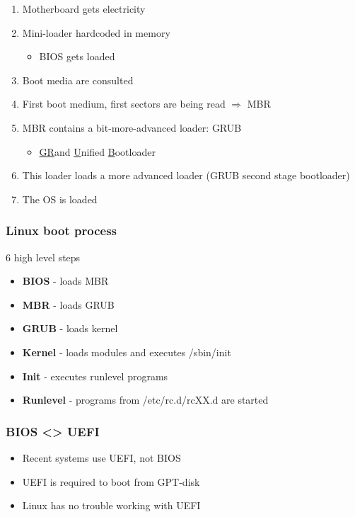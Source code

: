 \documentclass{article}
\begin{document}
\begin{enumerate}
    \item Motherboard gets electricity
    \item Mini-loader hardcoded in memory
    \begin{itemize}
        \item BIOS gets loaded
    \end{itemize}
    \item Boot media are consulted
    \item First boot medium, first sectors are being read $\Rightarrow$ MBR
    \item MBR contains a bit-more-advanced loader: GRUB
    \begin{itemize}
        \item \underline{GR}and \underline{U}nified \underline{B}ootloader
    \end{itemize}
    \item This loader loads a more advanced loader (GRUB second stage bootloader)
    \item The OS is loaded
\end{enumerate}

\subsubsection{Linux boot process}

6 high level steps

\begin{itemize}
    \item \textbf{BIOS} - loads MBR
    \item \textbf{MBR} - loads GRUB
    \item \textbf{GRUB} - loads kernel
    \item \textbf{Kernel} - loads modules and executes /sbin/init
    \item \textbf{Init} - executes runlevel programs
    \item \textbf{Runlevel} - programs from /etc/rc.d/rcXX.d are started
\end{itemize}

\subsubsection{BIOS <> UEFI}

\begin{itemize}
    \item Recent systems use UEFI, not BIOS
    \item UEFI is required to boot from GPT-disk
    \item Linux has no trouble working with UEFI
\end{itemize}
\end{document}
